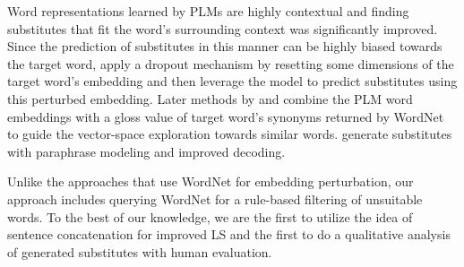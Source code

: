 Word representations learned by PLMs are highly contextual and finding substitutes that fit the word's surrounding context was significantly improved. Since the prediction of substitutes in this manner can be highly biased towards the target word, \citet{zhou-etal-2019-bert} apply a dropout mechanism by resetting some dimensions of the target word's embedding and then leverage the model to predict substitutes using this perturbed embedding. Later methods by \citet{michalopoulos-etal-2022-lexsubcon} and \citet{seneviratne-etal-2022-cilex} combine the PLM word embeddings with a gloss value of target word's synonyms returned by WordNet
to guide the vector-space exploration towards similar words. \citet{qiang-etal-2023-parals} generate substitutes with paraphrase modeling and improved decoding.

Unlike the approaches that use WordNet for embedding perturbation, our approach includes querying WordNet for a rule-based filtering of unsuitable words.
To the best of our knowledge, we are the first to utilize the idea of sentence concatenation for improved LS and the first to do a qualitative analysis of generated substitutes with human evaluation.%

